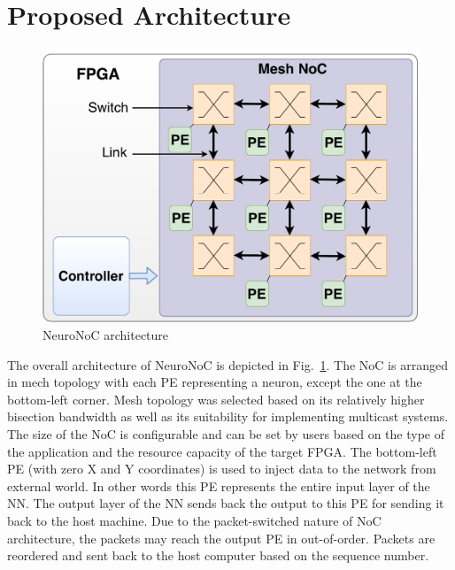 \section{Proposed Architecture}

\begin{figure}
    \includegraphics[width=\columnwidth]{Figures/overall3.pdf}
    \caption{NeuroNoC architecture} 
    \label{figure:neuronoc}
\end{figure}

The overall architecture of NeuroNoC is depicted in Fig.~\ref{figure:neuronoc}.
The NoC is arranged in mech topology with each PE representing a neuron, except the one at the bottom-left corner.
Mesh topology was selected based on its relatively higher bisection bandwidth as well as its suitability for implementing multicast systems. 
The size of the NoC is configurable and can be set by users based on the type of the application and the resource capacity of the target FPGA.
The bottom-left PE (with zero X and Y coordinates) is used to inject data to the network from external world.
In other words this PE represents the entire input layer of the NN.
The output layer of the NN sends back the output to this PE for sending it back to the host machine.
Due to the packet-switched nature of NoC architecture, the packets may reach the output PE in out-of-order.
Packets are reordered and sent back to the host computer based on the sequence number.

